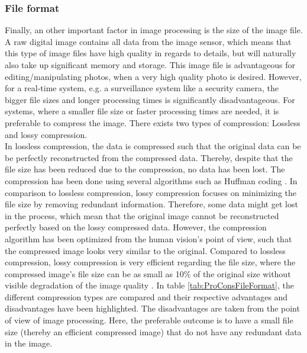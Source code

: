 
\subsubsection*{File format}
Finally, an other important factor in image processing is the size of the image file. A raw digital image contains all data from the image sensor, which means that this type of image files have high quality in regards to details, but will naturally also take up significant memory and storage. This image file is advantageous for editing/manipulating photos, when a very high quality photo is desired. However, for a real-time system, e.g. a surveillance system like a security camera, the bigger file sizes and longer processing times is significantly disadvantageous. For systems, where a smaller file size or faster processing times are needed, it is preferable to compress the image. There exists two types of compression: Lossless and lossy compression. \\

In lossless compression, the data is compressed such that the original data can be be perfectly reconstructed from the compressed data. Thereby, despite that the file size has been reduced due to the compression, no data has been lost. The compression has been done using several algorithms such as Huffman coding \citep{Lossless49:online}. In comparison to lossless compression, lossy compression focuses on minimizing the file size by removing redundant information. Therefore, some data might get lost in the process, which mean that the original image cannot be reconstructed perfectly based on the lossy compressed data. However, the compression algorithm has been optimized from the human vision's point of view, such that the compressed image looks very similar to the original. Compared to lossless compression, lossy compression is very efficient regarding the file size, where the compressed image's file size can be as small as 10\% of the original size without visible degradation of the image quality \citep{LossyDat32:online}. In table \ref{tab:ProConsFileFormat}, the different compression types are compared and their respective advantages and disadvantages have been highlighted. The disadvantages are taken from the point of view of image processing. Here, the preferable outcome is to have a small file size (thereby an efficient compressed image) that do not have any redundant data in the image. 

